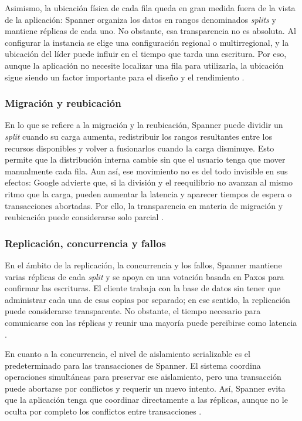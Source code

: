 \documentclass[11pt,a4paper]{article}
\begin{document}
Asimismo, la ubicación física de cada fila queda en gran medida fuera de la vista de la aplicación: Spanner organiza los datos en rangos denominados \emph{splits} y mantiene réplicas de cada uno. No obstante, esa transparencia no es absoluta. Al configurar la instancia se elige una configuración regional o multirregional, y la ubicación del líder puede influir en el tiempo que tarda una escritura. Por eso, aunque la aplicación no necesite localizar una fila para utilizarla, la ubicación sigue siendo un factor importante para el diseño y el rendimiento \cite{GoogleSpannerReplication}.

\subsubsection{Migración y reubicación}
En lo que se refiere a la migración y la reubicación, Spanner puede dividir un \emph{split} cuando su carga aumenta, redistribuir los rangos resultantes entre los recursos disponibles y volver a fusionarlos cuando la carga disminuye. Esto permite que la distribución interna cambie sin que el usuario tenga que mover manualmente cada fila. Aun así, ese movimiento no es del todo invisible en sus efectos: Google advierte que, si la división y el reequilibrio no avanzan al mismo ritmo que la carga, pueden aumentar la latencia y aparecer tiempos de espera o transacciones abortadas. Por ello, la transparencia en materia de migración y reubicación puede considerarse solo parcial \cite{GoogleSpannerPreSplitting}.

\subsubsection{Replicación, concurrencia y fallos}
En el ámbito de la replicación, la concurrencia y los fallos, Spanner mantiene varias réplicas de cada \emph{split} y se apoya en una votación basada en Paxos para confirmar las escrituras. El cliente trabaja con la base de datos sin tener que administrar cada una de esas copias por separado; en ese sentido, la replicación puede considerarse transparente. No obstante, el tiempo necesario para comunicarse con las réplicas y reunir una mayoría puede percibirse como latencia \cite{GoogleSpannerReplication}.

En cuanto a la concurrencia, el nivel de aislamiento serializable es el predeterminado para las transacciones de Spanner. El sistema coordina operaciones simultáneas para preservar ese aislamiento, pero una transacción puede abortarse por conflictos y requerir un nuevo intento. Así, Spanner evita que la aplicación tenga que coordinar directamente a las réplicas, aunque no le oculta por completo los conflictos entre transacciones \cite{GoogleSpannerTransactions}.
\end{document}
